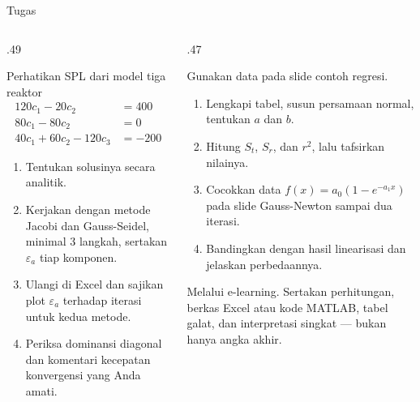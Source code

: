 \documentclass[aspectratio=169,10pt]{beamer}
\begin{document}
\begin{frame}{Tugas}
\scriptsize
\begin{columns}[T,totalwidth=\textwidth]
\begin{column}{.49\textwidth}
\begin{bluebox}
Perhatikan SPL dari model tiga reaktor
\[
\begin{aligned}
120c_1-20c_2\phantom{-120c_3}&=400\\
80c_1-80c_2\phantom{-120c_3}&=0\\
40c_1+60c_2-120c_3&=-200
\end{aligned}
\]
\begin{enumerate}\setlength\itemsep{2pt}
\item Tentukan solusinya secara analitik.
\item Kerjakan dengan metode Jacobi dan Gauss-Seidel, minimal 3 langkah, sertakan $\varepsilon_a$ tiap komponen.
\item Ulangi di Excel dan sajikan plot $\varepsilon_a$ terhadap iterasi untuk kedua metode.
\item Periksa dominansi diagonal dan komentari kecepatan konvergensi yang Anda amati.
\end{enumerate}
\end{bluebox}
\end{column}
\begin{column}{.47\textwidth}
\begin{orangebox}
Gunakan data pada slide contoh regresi.
\begin{enumerate}\setlength\itemsep{2pt}
\item Lengkapi tabel, susun persamaan normal, tentukan $a$ dan $b$.
\item Hitung $S_t$, $S_r$, dan $r^2$, lalu tafsirkan nilainya.
\item Cocokkan data $f(x)=a_0(1-e^{-a_1x})$ pada slide Gauss-Newton sampai dua iterasi.
\item Bandingkan dengan hasil linearisasi dan jelaskan perbedaannya.
\end{enumerate}
\end{orangebox}
\begin{greenbox}[Pengumpulan]
Melalui e-learning. Sertakan perhitungan, berkas Excel atau kode MATLAB, tabel galat, dan interpretasi singkat --- bukan hanya angka akhir.
\end{greenbox}
\end{column}
\end{columns}
\end{frame}
\end{document}
